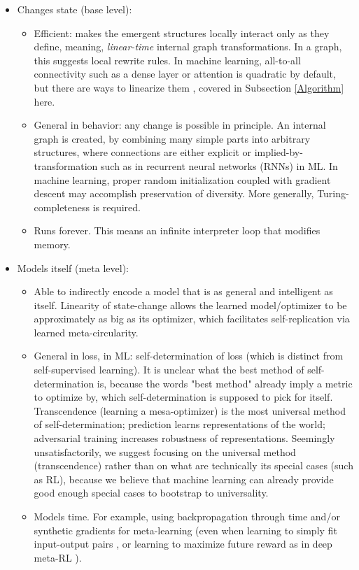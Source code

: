 \documentclass{article}
\begin{document}
\begin{itemize}
\item Changes state (base level):
\begin{itemize}
\item Efficient: makes the emergent structures locally interact only as they define, meaning, \textit{linear-time} internal graph transformations. In a graph, this suggests local rewrite rules. In machine learning, all-to-all connectivity such as a dense layer or attention is quadratic by default, but there are ways to linearize them \cite{tolstikhin2021mlpmixer} \cite{schlag2021linear}, covered in Subsection \ref{Algorithm} here.
\item General in behavior: any change is possible in principle. An internal graph is created, by combining many simple parts into arbitrary structures, where connections are either explicit or implied-by-transformation such as in recurrent neural networks (RNNs) in ML. In machine learning, proper random initialization coupled with gradient descent may accomplish preservation of diversity. More generally, Turing-completeness is required.
\item Runs forever. This means an infinite interpreter loop that modifies memory.
\end{itemize}
\item Models itself (meta level):
\begin{itemize}
\item Able to indirectly encode a model that is as general and intelligent as itself. Linearity of state-change allows the learned model/optimizer to be approximately as big as its optimizer, which facilitates self-replication via learned meta-circularity.
\item General in loss, in ML: self-determination of loss (which is distinct from self-supervised learning). It is unclear what the best method of self-determination is, because the words "best method" already imply a metric to optimize by, which self-determination is supposed to pick for itself. Transcendence (learning a mesa-optimizer) is the most universal method of self-determination; prediction learns representations of the world; adversarial training increases robustness of representations. Seemingly unsatisfactorily, we suggest focusing on the universal method (transcendence) rather than on what are technically its special cases (such as RL), because we believe that machine learning can already provide good enough special cases to bootstrap to universality.
\item Models time. For example, using backpropagation through time and/or synthetic gradients for meta-learning (even when learning to simply fit input-output pairs \cite{santoro2016oneshot}, or learning to maximize future reward as in deep meta-RL \cite{DBLP:journals/corr/WangKTSLMBKB16}).
\end{itemize}
\end{itemize}
\end{document}
